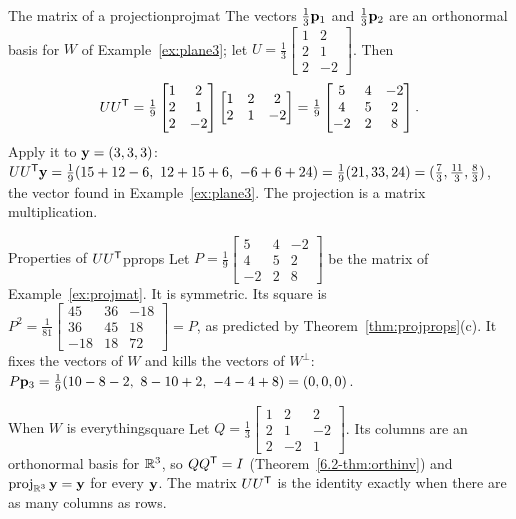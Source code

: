 \documentclass[11pt]{article}
\begin{document}
\begin{exmp}{The matrix of a projection}{projmat}
The vectors $\tfrac13\mathbf{p}_1$ and $\tfrac13\mathbf{p}_2$ are an orthonormal basis for $W$ of Example~\ref{ex:plane3}; let $U=\tfrac13\begin{bmatrix}1&2\\2&1\\2&-2\end{bmatrix}$. Then
\[
UU^{\mathsf T}=\tfrac19\begin{bmatrix}1&2\\2&1\\2&-2\end{bmatrix}\begin{bmatrix}1&2&2\\2&1&-2\end{bmatrix}=\tfrac19\begin{bmatrix}5&4&-2\\4&5&2\\-2&2&8\end{bmatrix}.
\]
Apply it to $\mathbf{y}=(3,3,3)$: $UU\T\bv{y}=\tfrac19(15+12-6,\ 12+15+6,\ -6+6+24)=\tfrac19(21,33,24)=(\tfrac73,\tfrac{11}3,\tfrac83)$, the vector found in Example~\ref{ex:plane3}. The projection is a matrix multiplication.
\end{exmp}

\begin{exmp}{Properties of $UU^{\mathsf T}$}{pprops}
Let $P=\tfrac19\begin{bmatrix}5&4&-2\\4&5&2\\-2&2&8\end{bmatrix}$ be the matrix of Example~\ref{ex:projmat}. It is symmetric. Its square is $P^2=\tfrac1{81}\begin{bmatrix}45&36&-18\\36&45&18\\-18&18&72\end{bmatrix}=P$, as predicted by Theorem~\ref{thm:projprops}(c). It fixes the vectors of $W$ and kills the vectors of $W^{\perp}$: $P\bv{p}_3=\tfrac19(10-8-2,\ 8-10+2,\ -4-4+8)=(0,0,0)$.
\end{exmp}

\begin{exmp}{When $W$ is everything}{square}
Let $Q=\tfrac13\begin{bmatrix}1&2&2\\2&1&-2\\2&-2&1\end{bmatrix}$. Its columns are an orthonormal basis for $\mathbb{R}^3$, so $QQ^{\mathsf T}=I$ (Theorem~\ref{6.2-thm:orthinv}) and $\operatorname{proj}_{\mathbb{R}^3}\mathbf{y}=\mathbf{y}$ for every $\mathbf{y}$. The matrix $UU^{\mathsf T}$ is the identity exactly when there are as many columns as rows.
\end{exmp}
\end{document}
